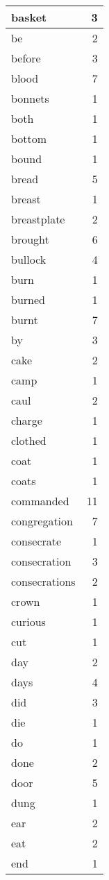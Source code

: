 \begin{center}
\begin{longtable}{l|r}
basket & 3 \\ \hline
be & 2 \\ \hline
before & 3 \\ \hline
blood & 7 \\ \hline
bonnets & 1 \\ \hline
both & 1 \\ \hline
bottom & 1 \\ \hline
bound & 1 \\ \hline
bread & 5 \\ \hline
breast & 1 \\ \hline
breastplate & 2 \\ \hline
brought & 6 \\ \hline
bullock & 4 \\ \hline
burn & 1 \\ \hline
burned & 1 \\ \hline
burnt & 7 \\ \hline
by & 3 \\ \hline
cake & 2 \\ \hline
camp & 1 \\ \hline
caul & 2 \\ \hline
charge & 1 \\ \hline
clothed & 1 \\ \hline
coat & 1 \\ \hline
coats & 1 \\ \hline
commanded & 11 \\ \hline
congregation & 7 \\ \hline
consecrate & 1 \\ \hline
consecration & 3 \\ \hline
consecrations & 2 \\ \hline
crown & 1 \\ \hline
curious & 1 \\ \hline
cut & 1 \\ \hline
day & 2 \\ \hline
days & 4 \\ \hline
did & 3 \\ \hline
die & 1 \\ \hline
do & 1 \\ \hline
done & 2 \\ \hline
door & 5 \\ \hline
dung & 1 \\ \hline
ear & 2 \\ \hline
eat & 2 \\ \hline
end & 1 \\ \hline

\end{longtable}
\end{center}
